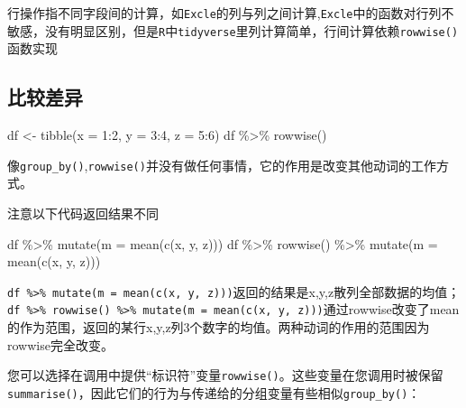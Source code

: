 \documentclass[
]{book}
\newenvironment{Shaded}{\begin{snugshade}}{\end{snugshade}}
\newcommand{\AttributeTok}[1]{\textcolor[rgb]{0.77,0.63,0.00}{#1}}
\newcommand{\DecValTok}[1]{\textcolor[rgb]{0.00,0.00,0.81}{#1}}
\newcommand{\FunctionTok}[1]{\textcolor[rgb]{0.00,0.00,0.00}{#1}}
\newcommand{\NormalTok}[1]{#1}
\newcommand{\OtherTok}[1]{\textcolor[rgb]{0.56,0.35,0.01}{#1}}
\newcommand{\SpecialCharTok}[1]{\textcolor[rgb]{0.00,0.00,0.00}{#1}}
\begin{document}
行操作指不同字段间的计算，如\texttt{Excle}的列与列之间计算,\texttt{Excle}中的函数对行列不敏感，没有明显区别，但是\texttt{R}中\texttt{tidyverse}里列计算简单，行间计算依赖\texttt{rowwise()}函数实现

\hypertarget{ux6bd4ux8f83ux5deeux5f02}{%
\subsection{比较差异}\label{ux6bd4ux8f83ux5deeux5f02}}

\begin{Shaded}
\begin{Highlighting}[]
\NormalTok{df }\OtherTok{\textless{}{-}} \FunctionTok{tibble}\NormalTok{(}\AttributeTok{x =} \DecValTok{1}\SpecialCharTok{:}\DecValTok{2}\NormalTok{, }\AttributeTok{y =} \DecValTok{3}\SpecialCharTok{:}\DecValTok{4}\NormalTok{, }\AttributeTok{z =} \DecValTok{5}\SpecialCharTok{:}\DecValTok{6}\NormalTok{)}
\NormalTok{df }\SpecialCharTok{\%\textgreater{}\%} \FunctionTok{rowwise}\NormalTok{()}
\end{Highlighting}
\end{Shaded}

像\texttt{group\_by()},\texttt{rowwise()}并没有做任何事情，它的作用是改变其他动词的工作方式。

注意以下代码返回结果不同

\begin{Shaded}
\begin{Highlighting}[]
\NormalTok{df }\SpecialCharTok{\%\textgreater{}\%} \FunctionTok{mutate}\NormalTok{(}\AttributeTok{m =} \FunctionTok{mean}\NormalTok{(}\FunctionTok{c}\NormalTok{(x, y, z)))}
\NormalTok{df }\SpecialCharTok{\%\textgreater{}\%} \FunctionTok{rowwise}\NormalTok{() }\SpecialCharTok{\%\textgreater{}\%} \FunctionTok{mutate}\NormalTok{(}\AttributeTok{m =} \FunctionTok{mean}\NormalTok{(}\FunctionTok{c}\NormalTok{(x, y, z)))}
\end{Highlighting}
\end{Shaded}

\texttt{df\ \%\textgreater{}\%\ mutate(m\ =\ mean(c(x,\ y,\ z)))}返回的结果是x,y,z散列全部数据的均值；\texttt{df\ \%\textgreater{}\%\ rowwise()\ \%\textgreater{}\%\ mutate(m\ =\ mean(c(x,\ y,\ z)))}通过rowwise改变了mean的作为范围，返回的某行x,y,z列3个数字的均值。两种动词的作用的范围因为rowwise完全改变。

您可以选择在调用中提供``标识符''变量\texttt{rowwise()}。这些变量在您调用时被保留\texttt{summarise()}，因此它们的行为与传递给的分组变量有些相似\texttt{group\_by()}：
\end{document}

